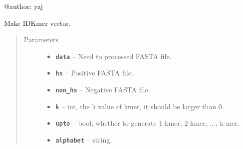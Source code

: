 \documentclass[letterpaper,10pt,english]{sphinxmanual}
\begin{document}
@author: yzj

\begin{fulllineitems}
\label{reference/PyDNAnac:PyDNAnac.CheckNacPara}
\end{fulllineitems}


\begin{fulllineitems}
\label{reference/PyDNAnac:PyDNAnac.GetIdKmer}
Make IDKmer vector.
\begin{quote}\begin{description}
\item[{Parameters}] \leavevmode\begin{itemize}
\item {} 
\textbf{\texttt{data}} -- Need to processed FASTA file.

\item {} 
\textbf{\texttt{hs}} -- Positive FASTA file.

\item {} 
\textbf{\texttt{non\_hs}} -- Negative FASTA file.

\item {} 
\textbf{\texttt{k}} -- int, the k value of kmer, it should be larger than 0.

\item {} 
\textbf{\texttt{upto}} -- bool, whether to generate 1-kmer, 2-kmer, ..., k-mer.

\item {} 
\textbf{\texttt{alphabet}} -- string.

\end{itemize}

\end{description}\end{quote}

\end{fulllineitems}

\end{document}
